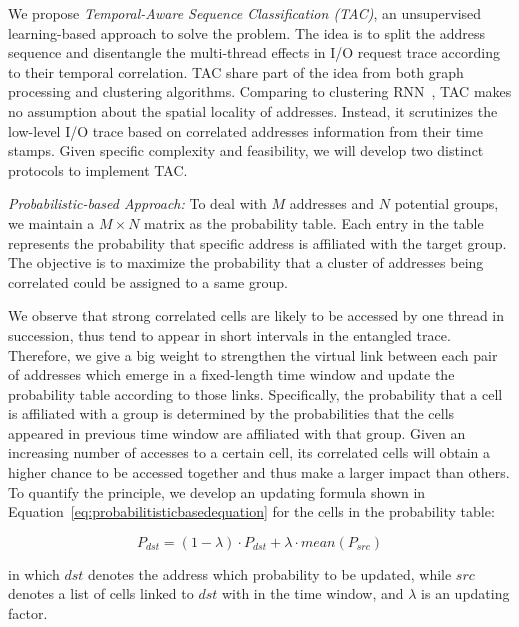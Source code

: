 We propose \emph{Temporal-Aware Sequence Classification (TAC)},
an unsupervised learning-based approach to solve the problem.
The idea is to split the address sequence
and disentangle the multi-thread effects in I/O request trace
according to their temporal correlation.
TAC share part of the idea from both graph processing and clustering algorithms.
Comparing to clustering RNN~\cite{hashemi2018learning},
TAC makes no assumption about the spatial locality of addresses.
Instead, it scrutinizes the low-level I/O trace based on correlated addresses
information from their time stamps.
Given specific complexity and feasibility,
we will develop two distinct protocols to implement TAC.

\emph{Probabilistic-based Approach:}
To deal with $M$ addresses and $N$ potential groups, we maintain a $M\times N$ matrix
as the probability table.
Each entry in the table represents the probability that specific address is
affiliated with the target group.
The objective is to maximize the probability that a cluster of addresses being
correlated could be assigned to a same group.

We observe that strong correlated cells are likely to be accessed
by one thread in succession, thus tend to appear in short intervals
in the entangled trace.
Therefore, we give a big weight to strengthen the virtual link
between each pair of addresses which emerge in a fixed-length time window
and update the probability table according to those links.
Specifically, the probability that a cell is affiliated with a group is determined by the probabilities that the cells appeared in previous time window are affiliated with that group.
Given an increasing number of accesses to a certain cell,
its correlated cells will obtain a higher chance to be accessed together
and thus make a larger impact than others.
To quantify the principle, we develop an updating formula shown in Equation~\ref{eq:probabilitisticbasedequation} for the cells in the probability table:

\begin{equation}
\label{eq:probabilitisticbasedequation}
P_{dst} = (1 - \lambda) \cdot P_{dst} + \lambda \cdot mean(P_{src})
\end{equation}

in which $dst$ denotes the address which probability to be updated,
while $src$ denotes a list of cells linked to $dst$ with in the time window, and $\lambda$ is an updating factor.

